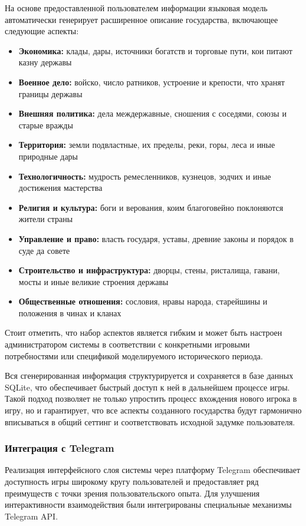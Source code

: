На основе предоставленной пользователем информации языковая модель автоматически генерирует расширенное описание государства, включающее следующие аспекты:
\begin{itemize}
\item \textbf{Экономика:} клады, дары, источники богатств и торговые пути, кои питают казну державы
\item \textbf{Военное дело:} войско, число ратников, устроение и крепости, что хранят границы державы
\item \textbf{Внешняя политика:} дела междержавные, сношения с соседями, союзы и старые вражды
\item \textbf{Территория:} земли подвластные, их пределы, реки, горы, леса и иные природные дары
\item \textbf{Технологичность:} мудрость ремесленников, кузнецов, зодчих и иные достижения мастерства
\item \textbf{Религия и культура:} боги и верования, коим благоговейно поклоняются жители страны
\item \textbf{Управление и право:} власть государя, уставы, древние законы и порядок в суде да совете
\item \textbf{Строительство и инфраструктура:} дворцы, стены, ристалища, гавани, мосты и иные великие строения державы
\item \textbf{Общественные отношения:} сословия, нравы народа, старейшины и положения в чинах и кланах
\end{itemize}

Стоит отметить, что набор аспектов является гибким и может быть настроен администратором системы в соответствии с конкретными игровыми потребностями или спецификой моделируемого исторического периода.

Вся сгенерированная информация структурируется и сохраняется в базе данных SQLite, что обеспечивает быстрый доступ к ней в дальнейшем процессе игры. Такой подход позволяет не только упростить процесс вхождения нового игрока в игру, но и гарантирует, что все аспекты созданного государства будут гармонично вписываться в общий сеттинг и соответствовать исходной задумке пользователя.

\subsubsection{Интеграция с Telegram}

Реализация интерфейсного слоя системы через платформу Telegram обеспечивает доступность игры широкому кругу пользователей и предоставляет ряд преимуществ с точки зрения пользовательского опыта. Для улучшения интерактивности взаимодействия были интегрированы специальные механизмы Telegram API.

